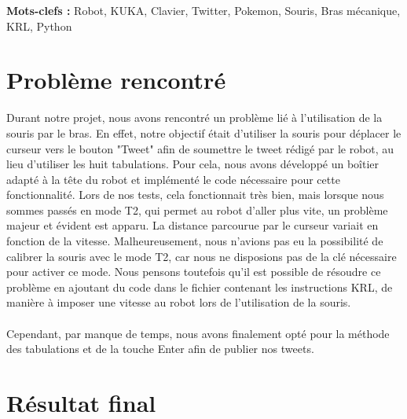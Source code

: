 \documentclass[twoside]{article}
\begin{document}
\textbf{Mots-clefs :} Robot, KUKA, Clavier, Twitter, Pokemon, Souris, Bras mécanique, KRL, Python
\begin{multicols}{2} %




\section{Problème rencontré}

Durant notre projet, nous avons rencontré un problème lié à l'utilisation de la souris par le bras.
En effet, notre objectif était d'utiliser la souris pour déplacer le curseur vers le bouton "Tweet" afin de soumettre le tweet rédigé par le robot, au lieu d'utiliser les huit tabulations.
Pour cela, nous avons développé un boîtier adapté à la tête du robot et implémenté le code nécessaire pour cette fonctionnalité.
Lors de nos tests, cela fonctionnait très bien, mais lorsque nous sommes passés en mode T2, qui permet au robot d'aller plus vite, un problème majeur et évident est apparu.
La distance parcourue par le curseur variait en fonction de la vitesse.
Malheureusement, nous n'avions pas eu la possibilité de calibrer la souris avec le mode T2, car nous ne disposions pas de la clé nécessaire pour activer ce mode.
Nous pensons toutefois qu'il est possible de résoudre ce problème en ajoutant du code dans le fichier contenant les instructions KRL, de manière à imposer une vitesse au robot lors de l'utilisation de la souris.
\\
\\
Cependant, par manque de temps, nous avons finalement opté pour la méthode des
tabulations et de la touche Enter afin de publier nos tweets.

\section{Résultat final}


\end{multicols}
\end{document}
